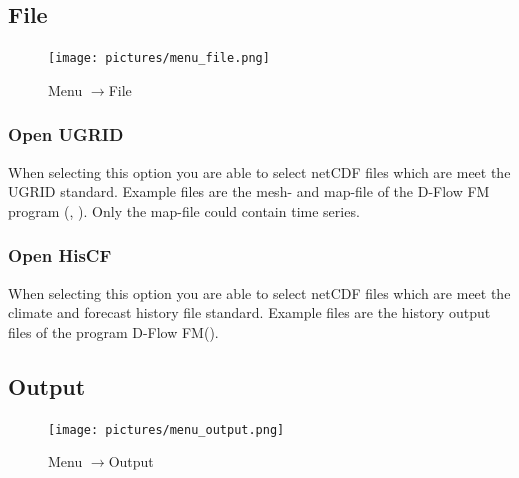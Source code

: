\documentclass{deltares_memo}
\newcommand{\menuarrow}{$\rightarrow$}
\newcommand{\dflowfm}{D-Flow FM\xspace}
\newcommand{\netcdf}{netCDF\xspace}
\begin{document}
\subsection{File}
\phantom{m}\vspace{-\baselineskip}
\begin{figure}[H]
    \centering
    \texttt{[image: pictures/menu\_file.png]}
    \caption{Menu \menuarrow File}
\end{figure}

\subsubsection{Open UGRID}
When selecting this option you are able to select \netcdf files which are meet the UGRID standard.
Example files are the mesh- and map-file of the \dflowfm program (, ).
Only the map-file could contain time series.
\subsubsection{Open HisCF}
When selecting this option you are able to select \netcdf files which are meet the climate and forecast history file standard.
Example files are the history output files of the program \dflowfm ().
\subsection{Output}
\phantom{m}\vspace{-\baselineskip}
\begin{figure}[H]
    \centering
    \texttt{[image: pictures/menu\_output.png]}
    \caption{Menu \menuarrow Output}
\end{figure}

\end{document}
